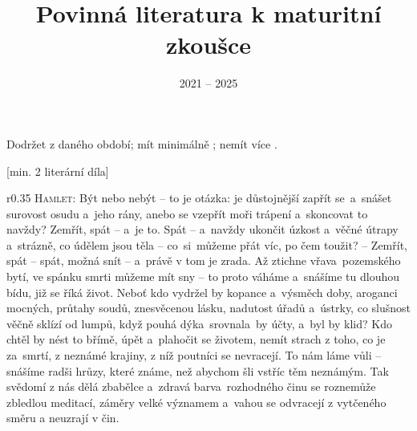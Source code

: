 \documentclass{extarticle} %
\author{\theauthor}
\title{Povinná literatura k maturitní zkoušce}
\date{2021 -- 2025}
\begin{document}
\changefontsize{7pt}


\tableofcontents

\vfill\noindent\begin{minipage}{\textwidth}
    {\TOCRULE{\rule{\linewidth}{0.4pt}}\vspace{1em}
    \footnotesize{} Dodržet  z daného období;
    mít minimálně ;
    nemít více .}
\end{minipage}

\thispagestyle{empty}

\newpage


\newpage

\setcounter{page}{1}

[min. 2 literární díla]


\changefontsize{6.4pt}


\noindent\begin{wrapfigure}{r}{0.35\textwidth}
\tiny{}\setlength{\parindent}{3pt}\noindent\textsc{Hamlet:} Být nebo nebýt -- to je otázka:
je důstojnější zapřít se~a~snášet surovost osudu a~jeho rány, anebo se vzepřít moři trápení a~skoncovat to navždy?
Zemřít, spát -- a~je to.
Spát -- a~navždy ukončit úzkost a~věčné útrapy a~strázně, co údělem jsou těla -- co~si~můžeme přát víc, po čem toužit?
-- Zemřít, spát -- spát, možná snít -- a~právě v tom je zrada.
Až ztichne vřava~pozemského bytí, ve spánku smrti můžeme mít sny -- to proto váháme a~snášíme tu dlouhou bídu, již se říká život.
Neboť kdo vydržel by kopance a~výsměch doby, aroganci mocných, průtahy soudů, znesvěcenou lásku, nadutost úřadů a~ústrky, co slušnost věčně sklízí od lumpů, když pouhá dýka~srovnala~by účty, a~byl by klid?
Kdo chtěl by nést to břímě, úpět a~plahočit se životem, nemít strach z toho, co je za~smrtí, z neznámé krajiny, z níž poutníci se nevracejí.
To nám láme vůli -- snášíme radši hrůzy, které známe, než abychom šli vstříc těm neznámým.
Tak svědomí z nás dělá zbabělce a~zdravá barva~rozhodného činu se roznemůže zbledlou meditací, záměry velké významem a~vahou se odvracejí z vytčeného směru a neuzrají v čin.
\end{wrapfigure}
\end{document}
